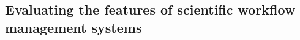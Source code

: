 \documentclass[a4paper,10pt]{scrreprt}
\begin{document}
\subsection{Evaluating the features of scientific workflow management systems}
\label{sec:eval_swms_features}
%
%
%
%
%
%
%
%
\end{document}
